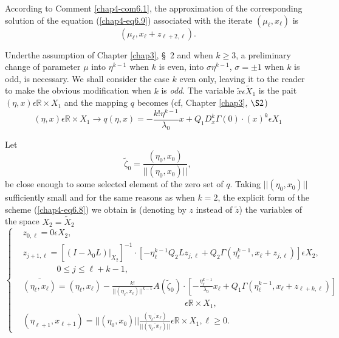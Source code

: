 According to Comment \ref{chap4-com6.1}, the approximation of the
corresponding solution of the equation (\ref{chap4-eq6.9}) associated
with the iterate $(\mu_{\ell}, x_{\ell})$ is
$$
(\mu_{\ell}, x_{\ell} + z_{\ell + 2, \ell}).
$$

Under\pageoriginale the assumption of Chapter \ref{chap3}, \S\ 2 and
when $k \geq 3$, a preliminary change of parameter $\mu$ into
$\eta^{k-1}$ when $k$ is even, into $\sigma \eta^{k-1}$, $\sigma = \pm
1$ when $k$ is odd, is necessary. We shall consider the case $k$ even
only, leaving it to the reader to make the obvious modification when $k$
is {\em odd}. The variable $\widetilde{x} \epsilon \widetilde{X}_{1}$
is the pait $(\eta, x) \epsilon \mathbb{R} \times X_{1}$ and the
mapping $q$ becomes (cf, Chapter \ref{chap3}, $\S 2$)
$$
(\eta, x) \epsilon \mathbb{R} \times X_{1} \to q(\eta, x) = -\frac{k!
  \eta^{k-1}}{\lambda_{0}} x + Q_{1}D_{x}^{k}\Gamma(0) \cdot (x)^{k}
\epsilon X_{1}
$$

Let 
$$
\widetilde{\zeta}_{0} = \frac{(\eta_{0}, x_{0})}{||(\eta_{0}, x_{0})||},
$$
be close enough to some selected element of the zero set of $q$. Taking
$||(\eta_{0}, x_{0})||$ sufficiently small and for the same reasons as
when $k = 2$, the explicit form of the scheme (\ref{chap4-eq6.8}) we
obtain is (denoting by $z$ instead of $\widetilde{z}$) the variables of
the space $X_{2} = \widetilde{X}_{2}$
{\fontsize{10}{12}\selectfont
\begin{equation*}
\begin{cases}
& z_{0, \ell} = 0 \epsilon X_{2},\\
& z_{j+1, \ell} = [(I - \lambda_{0}L)|_{X_{2}}]^{-1} \cdot
  [-\eta_{\ell}^{k-1}Q_{2}Lz_{j, \ell} +
    Q_{2}\Gamma(\eta_{\ell}^{k-1}, x_{\ell} + z_{j, \ell})] \epsilon
  X_{2},\\ 
&\qquad\qquad 0 \leq j \leq \ell + k - 1,\\
& \overline{(\eta_{\ell}, x_{\ell})} = (\eta_{\ell}, x_{\ell}) -
  \frac{k!}{||(\eta_{\ell}, x_{\ell})||^{k-1}}
  A(\widetilde{\zeta}_{0}) \cdot
  [-\frac{\eta_{\ell}^{k-1}}{\lambda_{0}} x_{\ell} + Q_{1}\Gamma
    (\eta_{\ell}^{k-1}, x_{\ell} + z_{\ell + k, \ell})]\\ 
  &\hspace{8cm} \epsilon
  \mathbb{R} \times X_{1},\\
& (\eta_{\ell + 1}, x_{\ell + 1}) = ||(\eta_{0}, x_{0})||
  \frac{(\overline{\eta_{\ell}, x_{\ell}})}{||(\overline{\eta_{\ell},
      x_{\ell}})||} \epsilon \mathbb{R} \times X_{1}, \ell \geq 0.
\end{cases}\tag{6.12}\label{chap4-eq6.12}
\end{equation*}}


